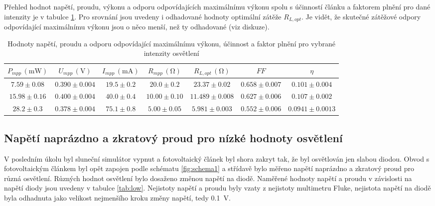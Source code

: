 \documentclass{../concepts/prepareprotokol} %
\begin{document}
Přehled hodnot napětí, proudu, výkonu a odporu odpovídajících maximálnímu výkonu spolu s účinností článku a faktorem plnění pro dané intenzity je v tabulce \ref{tab:etaff}. Pro srovnání jsou uvedeny i odhadované hodnoty optimální zátěže $R_{L,opt}$. Je vidět, že skutečné zátěžové odpory odpovídající maximálnímu výkonu jsou o něco menší, než ty odhadované (viz diskuze).

\begin{table}[hbtp]
\centering
\caption{Hodnoty napětí, proudu a odporu odpovídající maximálnímu výkonu, účinnost a faktor plnění pro vybrané intenzity osvětlení}
\begin{tabular}{ccccccc}
 \toprule
 $P_{mpp}\, (\mathrm{mW})$ & $U_{mpp}\, (\mathrm{V})$ & $I_{mpp}\, (\mathrm{mA})$ & $R_{mpp}\, (\mathrm{\Omega})$ & $R_{L,opt}\, (\mathrm{\Omega})$ & $FF$ & $\eta$ \\
 \midrule
 $7.59 \pm 0.08$ & $0.390 \pm 0.004$ & $19.5 \pm 0.2$ & $20.0 \pm 0.2$ & $23.37 \pm 0.02$ & $0.658 \pm 0.007$ & $0.101 \pm 0.004$ \\
 $15.98 \pm 0.16$ & $0.400 \pm 0.004$ & $40.0 \pm 0.4$ & $10.00 \pm 0.10$ & $11.489 \pm 0.008$ & $0.627 \pm 0.006$ & $0.107 \pm 0.002$ \\
 $28.2 \pm 0.3$ & $0.378 \pm 0.004$ & $75.1 \pm 0.8$ & $5.00 \pm 0.05$ & $5.981 \pm 0.003$ & $0.552 \pm 0.006$ & $0.0941 \pm 0.0013$ \\
 \bottomrule
\end{tabular}
\label{tab:etaff}
\end{table}

\newpage

\subsection{Napětí naprázdno a zkratový proud pro nízké hodnoty osvětlení}

V posledním úkolu byl sluneční simulátor vypnut a fotovoltaický článek byl shora zakryt tak, že byl osvětlován jen slabou diodou. Obvod s fotovoltaickým článkem byl opět zapojen podle schématu \ref{fig:schema1} a střídavě bylo měřeno napětí naprázdno a zkratový proud pro různá osvětlení. Různých hodnot osvětlení bylo dosaženo změnou napětí na diodě. Naměřené hodnoty napětí a proudu v závislosti na napětí diody jsou uvedeny v tabulce \ref{tab:low}. Nejistoty napětí a proudu byly vzaty z nejistoty multimetru Fluke, nejistota napětí na diodě byla odhadnuta jako velikost nejmenšího kroku změny napětí, tedy \SI{0.1}{V}.
\end{document}
